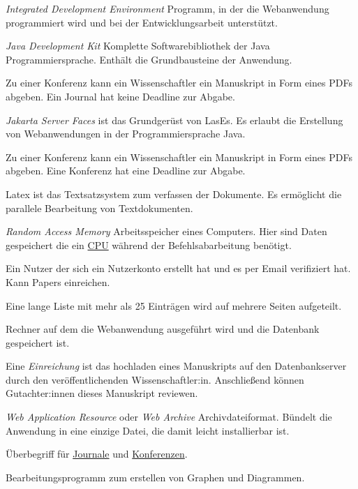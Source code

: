 \begin{description}
	 \emph{Integrated Development Environment} Programm, in der die Webanwendung programmiert wird und bei der Entwicklungsarbeit unterstützt.

	 \emph{Java Development Kit} Komplette Softwarebibliothek der Java Programmiersprache. Enthält die Grundbausteine der Anwendung.

	 Zu einer Konferenz kann ein Wissenschaftler ein Manuskript in Form eines PDFs abgeben. Ein Journal hat keine Deadline zur Abgabe.

	 \emph{Jakarta Server Faces} ist das Grundgerüst von LasEs. Es erlaubt die Erstellung von Webanwendungen in der Programmiersprache Java.

	 Zu einer Konferenz kann ein Wissenschaftler ein Manuskript in Form eines PDFs abgeben. Eine Konferenz hat eine Deadline zur Abgabe.

	 Latex ist das Textsatzsystem zum verfassen der Dokumente. Es ermöglicht die parallele Bearbeitung von Textdokumenten.

	 \emph{Random Access Memory} Arbeitsspeicher eines Computers. Hier sind Daten gespeichert die ein \hyperref[glo:cpu]{CPU} während der Befehlsabarbeitung benötigt.

	 Ein Nutzer der sich ein Nutzerkonto erstellt hat und es per Email verifiziert hat. Kann Papers einreichen.

	 Eine lange Liste mit mehr als 25 Einträgen wird auf mehrere Seiten aufgeteilt.

	 Rechner auf dem die Webanwendung ausgeführt wird und die Datenbank gespeichert ist.

	 Eine \emph{Einreichung} ist das hochladen eines Manuskripts auf den Datenbankserver durch den veröffentlichenden Wissenschaftler:in. Anschließend können Gutachter:innen dieses Manuskript reviewen.

	 \emph{Web Application Resource} oder \emph{Web Archive} Archivdateiformat. Bündelt die Anwendung in eine einzige Datei, die damit leicht installierbar ist.

	 Überbegriff für \hyperref[glo:journal]{Journale} und \hyperref[glo:konf]{Konferenzen}.

	 Bearbeitungsprogramm zum erstellen von Graphen und Diagrammen.
\end{description}